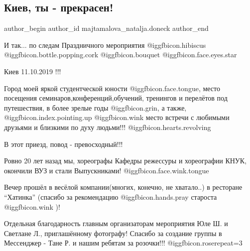  
 
 
 
 
 
\subsection{Киев, ты - прекрасен!}
\label{sec:20_10_2019.fb.majtamalova_natalja.doneck.1.kiev_ty_prekrasen}
 
\ifcmt
 author_begin
   author_id majtamalova_natalja.doneck
 author_end
\fi

И так... по следам Праздничного  мероприятия @igg{fbicon.hibiscus}
@igg{fbicon.bottle.popping.cork}  @igg{fbicon.bouquet}
@igg{fbicon.face.eyes.star} 

Киев 11.10.2019 !!!

Город моей яркой студентческой юности @igg{fbicon.face.tongue}, место посещения
семинаров,конференций,обучений, тренингов и перелётов под путешествия, в более
зрелые годы @igg{fbicon.grin}, а также, @igg{fbicon.index.pointing.up}
@igg{fbicon.wink} место встречи с любимыми друзьями и близкими по духу
людьми!!! @igg{fbicon.hearts.revolving} 


В этот приезд, повод - превосходный!!!

Ровно 20 лет назад мы, хореографы Кафедры режессуры и хореографии КНУК,
окончили ВУЗ и стали Выпускниками! @igg{fbicon.face.wink.tongue} 

Вечер прошёл в весёлой компании(многих, конечно, не хватало..) в ресторане
\enquote{Хатинка} (спасибо за рекомендацию @igg{fbicon.hands.pray}  староста @igg{fbicon.wink} )!

Отдельная благодарность главным  организаторам мероприятия Юле Ш. и Светлане Л.,
приглашённому фотографу! Спасибо за создание группы в Мессенджер - Тане Р. и
нашим ребятам за розочки!!! @igg{fbicon.rose}{repeat=3} 



